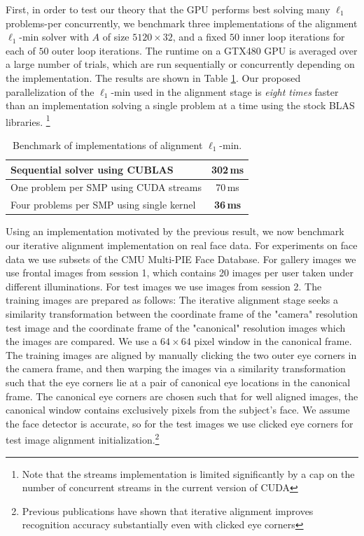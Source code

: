 \documentclass[10pt,twocolumn,letterpaper]{article}
\begin{document}
First, in order to test our theory that the GPU performs best solving many
$\ell_1$ problems-per concurrently, we benchmark three implementations of the
alignment $\ell_1$-min solver with $A$ of size $5120 \times 32$, and a fixed
$50$ inner loop iterations for each of $50$ outer loop iterations. The runtime
on a GTX480 GPU is averaged over a large number of trials, which are run
sequentially or concurrently depending on the implementation.
The results are shown in Table \ref{tbl:ubench}.
Our proposed parallelization of the $\ell_1$-min used in the alignment
stage is {\em eight times} faster than an implementation solving a single
problem at a time using the stock BLAS libraries.
\footnote{Note that the streams implementation is limited significantly by a 
cap on the number of concurrent streams in the current version of CUDA}
\begin{table}[h!]
\caption{Benchmark of implementations of alignment $\ell_1$-min.}
\begin{tabular}{|l|c|}
\hline
Sequential solver using CUBLAS & 302\,ms \\
\hline
One problem per SMP using CUDA streams & 70\,ms  \\
\hline
Four problems per SMP using single kernel & {\bf 36\,ms} \\
\hline
\end{tabular}
\label{tbl:ubench}
\end{table}
 
Using an implementation motivated by the previous result, we now benchmark our
iterative alignment implementation on real face data.  For experiments on face
data we use subsets of the CMU Multi-PIE Face Database.  For gallery images we
use frontal images from session 1, which contains 20 images per user taken
under different illuminations. For test images we use images from session 2.
The training images are prepared as follows: The iterative alignment stage
seeks a similarity transformation between the coordinate frame of the "camera"
resolution test image and the coordinate frame of the "canonical" resolution
images which the images are compared.  We use a $64 \times 64$ pixel window in
the canonical frame.  The training images are aligned by manually clicking the
two outer eye corners in the camera frame, and then warping the images via a
similarity transformation such that the eye corners lie at a pair of canonical
eye locations in the canonical frame.  The canonical eye corners are chosen
such that for well aligned images, the canonical window contains exclusively
pixels from the subject's face.  We assume the face detector is accurate, so
for the test images we use clicked eye corners for test image alignment
initialization.\footnote{Previous publications have shown that iterative
alignment improves recognition accuracy substantially even with clicked eye
corners}
\end{document}
